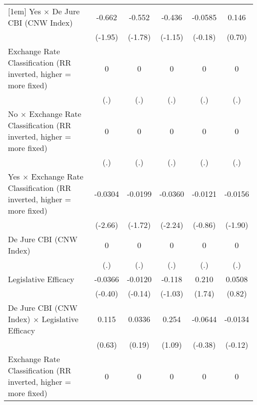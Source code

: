 {\begin{tabular*}{\linewidth}{@{\hskip\tabcolsep\extracolsep\fill}l*{5}{c}}
[1em]
Yes $\times$ De Jure CBI (CNW Index)&   -0.662         &   -0.552         &   -0.436         &  -0.0585         &    0.146         \\
                &  (-1.95)         &  (-1.78)         &  (-1.15)         &  (-0.18)         &   (0.70)         \\
[1em]
Exchange Rate Classification (RR inverted, higher = more fixed)&        0         &        0         &        0         &        0         &        0         \\
                &      (.)         &      (.)         &      (.)         &      (.)         &      (.)         \\
[1em]
No $\times$ Exchange Rate Classification (RR inverted, higher = more fixed)&        0         &        0         &        0         &        0         &        0         \\
                &      (.)         &      (.)         &      (.)         &      (.)         &      (.)         \\
[1em]
Yes $\times$ Exchange Rate Classification (RR inverted, higher = more fixed)&  -0.0304\sym{**} &  -0.0199         &  -0.0360\sym{*}  &  -0.0121         &  -0.0156         \\
                &  (-2.66)         &  (-1.72)         &  (-2.24)         &  (-0.86)         &  (-1.90)         \\
[1em]
De Jure CBI (CNW Index)&        0         &        0         &        0         &        0         &        0         \\
                &      (.)         &      (.)         &      (.)         &      (.)         &      (.)         \\
[1em]
Legislative Efficacy&  -0.0366         &  -0.0120         &   -0.118         &    0.210         &   0.0508         \\
                &  (-0.40)         &  (-0.14)         &  (-1.03)         &   (1.74)         &   (0.82)         \\
[1em]
De Jure CBI (CNW Index) $\times$ Legislative Efficacy&    0.115         &   0.0336         &    0.254         &  -0.0644         &  -0.0134         \\
                &   (0.63)         &   (0.19)         &   (1.09)         &  (-0.38)         &  (-0.12)         \\
[1em]
Exchange Rate Classification (RR inverted, higher = more fixed)&        0         &        0         &        0         &        0         &        0         \\

\end{tabular*}}
